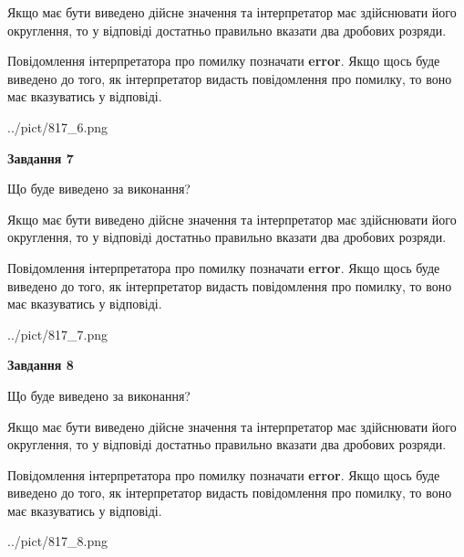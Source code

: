 \documentclass[12pt, ukrainian]{article}
\begin{document}
{\begin {Large}
Якщо має бути виведено дійсне значення та інтерпретатор має здійснювати його округлення, 
то у відповіді достатньо правильно вказати два дробових розряди.

Повідомлення інтерпретатора про помилку позначати \textbf{error}.
Якщо щось буде виведено до того, як інтерпретатор видасть повідомлення про помилку, 
то воно має вказуватись у відповіді. \par

\begin{center}
	{../pict/817_6.png}
\end{center}
\newpage

{\begin {center}\textbf{Завдання 7}\end {center}}\par
Що буде виведено за виконання? \par

Якщо має бути виведено дійсне значення та інтерпретатор має здійснювати його округлення, 
то у відповіді достатньо правильно вказати два дробових розряди.

Повідомлення інтерпретатора про помилку позначати \textbf{error}.
Якщо щось буде виведено до того, як інтерпретатор видасть повідомлення про помилку, 
то воно має вказуватись у відповіді. \par

\begin{center}
	{../pict/817_7.png}
\end{center}
\newpage

{\begin {center}\textbf{Завдання 8}\end {center}}\par
Що буде виведено за виконання? \par

Якщо має бути виведено дійсне значення та інтерпретатор має здійснювати його округлення, 
то у відповіді достатньо правильно вказати два дробових розряди.

Повідомлення інтерпретатора про помилку позначати \textbf{error}.
Якщо щось буде виведено до того, як інтерпретатор видасть повідомлення про помилку, 
то воно має вказуватись у відповіді. \par

\begin{center}
	{../pict/817_8.png}
\end{center}
\newpage


\end{Large}}
\end{document}
